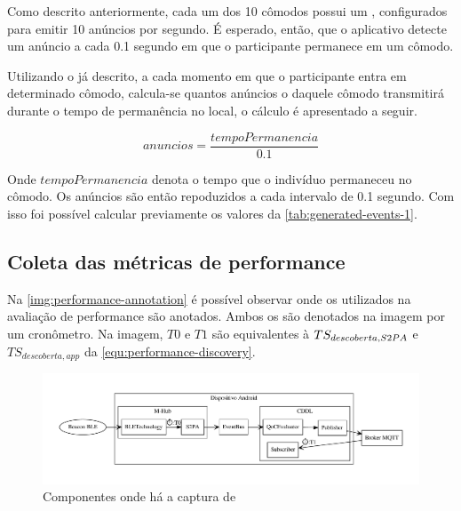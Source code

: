 Como descrito anteriormente, cada um dos 10 cômodos possui um \beacon \ble, configurados para emitir 10 anúncios por segundo. É esperado, então,  que o aplicativo detecte um anúncio a cada 0.1 segundo em que o participante permanece em um cômodo. 

Utilizando o \dataset já descrito, a cada momento em que o participante entra em determinado cômodo, calcula-se quantos anúncios o \beacon daquele cômodo transmitirá durante o tempo de permanência no local, o cálculo é apresentado a seguir.

\begin{equation}
	anuncios = \frac{tempoPermanencia}{0.1} 
\end{equation}

Onde $tempoPermanencia$ denota o tempo que o indivíduo permaneceu no cômodo. Os anúncios são então repoduzidos a cada intervalo de 0.1 segundo. Com isso foi possível calcular previamente os valores da \autoref{tab:generated-events-1}.

\subsection{Coleta das métricas de performance}

Na \autoref{img:performance-annotation} é possível observar onde os \timestamps utilizados na avaliação de performance são anotados. Ambos os \timestamps são denotados na imagem por um cronômetro. Na imagem, $T0$ e $T1$ são equivalentes à $TS_{descoberta,S2PA}$ e $TS_{descoberta,app}$ da \autoref{equ:performance-discovery}.

\begin{figure}[htb]
	
	\begin{center}

		\caption{\label{img:performance-annotation}Componentes onde há a captura de \timestamps}
		\includegraphics[scale = 0.50]{img/performance-annotation}
		\fonte{\autoriapropria}

	\end{center}
	
\end{figure}

